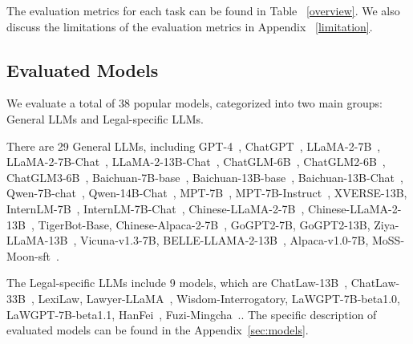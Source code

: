 The evaluation metrics for each task can be found in Table ~\ref{overview}. We also discuss the limitations of the evaluation metrics in Appendix ~\ref{limitation}.

\subsection{Evaluated Models}
We evaluate a total of 38 popular models, categorized into two main groups: General LLMs and Legal-specific LLMs.

There are 29 General LLMs, including GPT-4~\cite{openai2023gpt4}, ChatGPT~\cite{gpt3}, LLaMA-2-7B~\cite{touvron2023llama}, LLaMA-2-7B-Chat~\cite{touvron2023llama}, LLaMA-2-13B-Chat~\cite{touvron2023llama}, ChatGLM-6B~\cite{zeng2022glm}, ChatGLM2-6B~\cite{zeng2022glm}, ChatGLM3-6B~\cite{zeng2022glm}, Baichuan-7B-base~\cite{yang2023baichuan}, Baichuan-13B-base~\cite{yang2023baichuan}, Baichuan-13B-Chat~\cite{yang2023baichuan}, Qwen-7B-chat~\cite{bai2023qwen}, Qwen-14B-Chat~\cite{bai2023qwen}, MPT-7B~\cite{MosaicML2023Introducing}, MPT-7B-Instruct~\cite{MosaicML2023Introducing}, XVERSE-13B, InternLM-7B~\cite{2023internlm}, InternLM-7B-Chat~\cite{2023internlm}, Chinese-LLaMA-2-7B~\cite{Chinese-LLaMA-Alpaca}, Chinese-LLaMA-2-13B~\cite{Chinese-LLaMA-Alpaca}, TigerBot-Base, Chinese-Alpaca-2-7B~\cite{Chinese-LLaMA-Alpaca}, GoGPT2-7B, GoGPT2-13B, Ziya-LLaMA-13B~\cite{fengshenbang}, Vicuna-v1.3-7B, BELLE-LLAMA-2-13B~\cite{BELLE}, Alpaca-v1.0-7B, MoSS-Moon-sft~\cite{sun2023moss}.

The Legal-specific LLMs include 9 models, which are ChatLaw-13B~\cite{cui2023chatlaw}, ChatLaw-33B~\cite{cui2023chatlaw}, LexiLaw, Lawyer-LLaMA~\cite{huang2023lawyer}, Wisdom-Interrogatory, LaWGPT-7B-beta1.0, LaWGPT-7B-beta1.1, HanFei~\cite{HanFei}, Fuzi-Mingcha~\cite{sdu_fuzi_mingcha}.. 
The specific description of evaluated models can be found in the Appendix~\ref{sec:models}.

